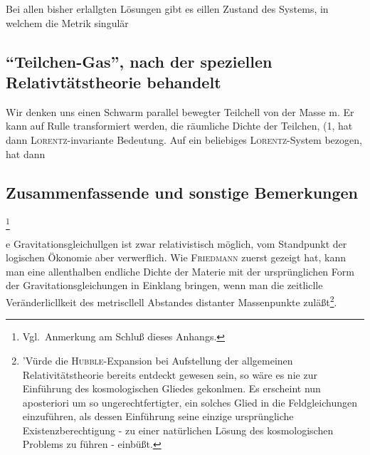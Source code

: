 
Bei allen bisher erlallgten Lösungen gibt es eillen
Zustand des Systems, in welchem die Metrik singulär

\subsection{\enquote{Teilchen-Gas}, nach der speziellen Relativtätstheorie behandelt}


Wir denken uns einen Schwarm parallel bewegter Teilchell von der Masse m. Er kann auf Rulle transformiert werden, die räumliche Dichte der Teilchen, (1, hat dann \textsc{Lorentz}-invariante Bedeutung. Auf ein beliebiges \textsc{Lorentz}-System bezogen, hat dann


\subsection{Zusammenfassende und sonstige Bemerkungen}\footnote{Vgl.\ Anmerkung am Schluß dieses Anhangs.}


e Gravitationsgleichullgen ist zwar relativistisch möglich, vom Standpunkt der logischen Ökonomie aber verwerflich. Wie \textsc{Friedmann} zuerst gezeigt hat, kann man eine allenthalben endliche Dichte der Materie mit der ursprünglichen Form der Gravitationsgleichungen in Einklang bringen, wenn man die zeitliclle Veränderlicllkeit des metriscllell Abstandes distanter Massenpunkte zuläßt\footnote{'Vürde die \textsc{Hubble}-Expansion bei Aufstellung der allgemeinen Relativitätstheorie bereits entdeckt gewesen sein, so wäre es nie zur Einführung des kosmologischen Gliedes gekonlmen. Es erscheint nun aposteriori um so  ungerechtfertigter, ein solches Glied in die Feldgleichungen einzuführen, als dessen Einführung seine einzige ursprüngliche Existenzberechtigung - zu einer natürlichen Lösung des kosmologischen Problems
zu führen - einbüßt.}.